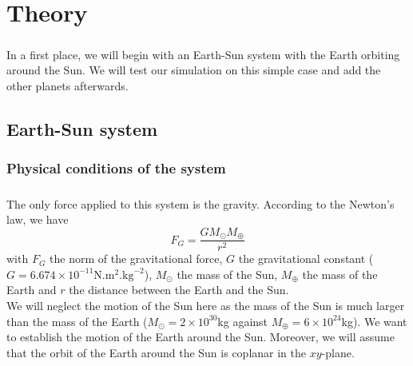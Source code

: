 \documentclass[a4paper, twoside, 11pt]{report}
\theoremstyle{theorem}
\theoremstyle{remark}
\theoremstyle{exemple}
\begin{document}
    \paragraph{}
    

\chapter{Theory}
    
    \paragraph{}In a first place, we will begin with an Earth-Sun system with the Earth orbiting around the Sun. We will test our simulation on this simple case and add the other planets afterwards. 

    \section{Earth-Sun system}
    
        \subsection{Physical conditions of the system}
        
            \paragraph{}The only force applied to this system is the gravity. According to the Newton's law, we have 
                \begin{equation}
                F_G = \frac{GM_{\odot}M_{\oplus}}{r^2}
                \tag{1}
                \end{equation}
            with $F_G$ the norm of the gravitational force, $G$ the gravitational constant ($G=6.674 \times 10^{-11} \mathrm{N}.\mathrm{m}^2.\mathrm{kg}^{-2}$), $M_{\odot}$ the mass of the Sun, $M_{\oplus}$ the mass of the Earth and $r$ the distance between the Earth and the Sun.\\
            We will neglect the motion of the Sun here as the mass of the Sun is much larger than the mass of the Earth ($M_{\odot} = 2 \times 10^{30}$kg against $M_{\oplus} = 6 \times 10^{24}$kg). We want to establish the motion of the Earth around the Sun. Moreover, we will assume that the orbit of the Earth around the Sun is coplanar in the $xy$-plane.
\end{document}
